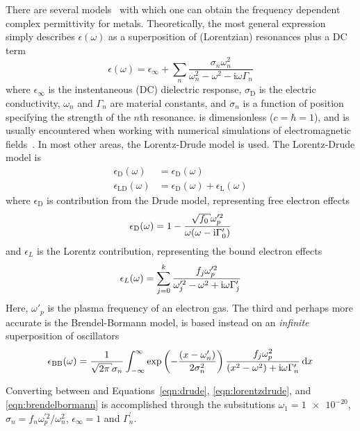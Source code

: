 There are several models~\cite{rakic1998optical} with which one
can obtain the frequency dependent complex permittivity for metals.
Theoretically, the most general expression simply describes
$\epsilon(\omega)$ as a superposition of (Lorentzian) resonances plus a DC
term
\begin{equation}
\epsilon(\omega)= \epsilon_\infty+\sum_n \frac{\sigma_n \omega_n^2} {\omega_n^2-\omega^2-{\mathrm{i}}\omega\Gamma_n}
\label{eqn:meepdispersion}
\end{equation}
where $\epsilon_\infty$ is the instentaneous (DC) dielectric response,
$\sigma_\mathrm{D}$ is the electric conductivity, $\omega_n$ and $\Gamma_n$ are
material constants, and $\sigma_n$ is a function of position specifying the
strength of the $n$th resonance.   is
dimensionless ($c=\hbar=1$), and is usually encountered when working with
numerical simulations of electromagnetic fields~\cite{oskooi2010meep}.
In most other areas, the Lorentz-Drude model is used.  The Lorentz-Drude model is 
\begin{align}
\epsilon_\mathrm{D}(\omega)&=\epsilon_\mathrm{D}(\omega)\\
\epsilon_\mathrm{LD}(\omega)&=\epsilon_\mathrm{D}(\omega)+\epsilon_\mathrm{L}(\omega)
\end{align}
where $\epsilon_\mathrm{D}$ is contribution from the Drude model, representing
free electron effects
\begin{align}
\epsilon_\mathrm{D}(\omega)=1-\frac{\sqrt{f_0} \omega_p^{\prime 2}}{\omega(\omega -
\mi\Gamma_0^\prime)}
\label{eqn:drude}
\end{align}
and $\epsilon_L$ is the Lorentz contribution, representing the bound
electron effects
\begin{align}
\epsilon_L(\omega) =\sum_{j=0}^{k}\frac{f_j\omega_p^{\prime 2}}{\omega_j^{\prime
2}-\omega^2+{\mathrm{i}}\omega\Gamma_j^\prime}
\label{eqn:lorentzdrude}
\end{align}
Here, $\omega'_p$ is the plasma frequency of an electron gas.
The third and perhaps more accurate is the Brendel-Bormann model, is based instead on an
\textit{infinite} superposition of oscillators
\begin{align}
\epsilon_\text{BB}(\omega) = \frac{1}{\sqrt{2 \pi} \sigma_n} \intinfty
\exp\left(-\frac{(x-\omega'_n)}{2 \sigma_n^2}\right)
\frac{f_j \omega_p^2}{(x^2-\omega^2)+\mi \omega \Gamma'_n} \md x
\label{eqn:brendelbormann}
\end{align}

Converting between  and
Equations~\ref{eqn:drude}, \ref{eqn:lorentzdrude}, and
\ref{eqn:brendelbormann} is accomplished through the subsitutions $\omega_1
= \num{1e-20}$, $\sigma_n = {f_n \omega_p^{\prime 2}}/{\omega_n^2}$,
$\epsilon_\infty=1$ and $\Gamma_n^\prime$.

